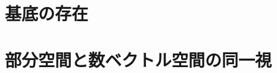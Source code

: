\documentclass[../../../topic_linear-algebra]{subfiles}
\begin{document}
\sectionline
\section{基底の存在}


\sectionline
\section{部分空間と数ベクトル空間の同一視}

\end{document}
